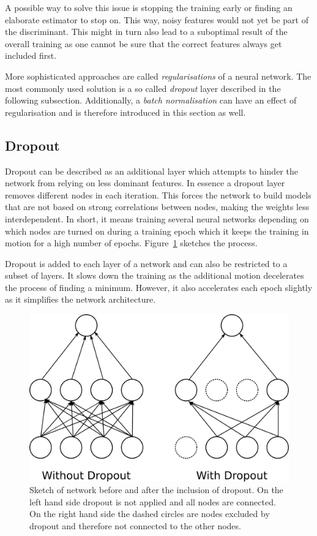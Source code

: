 A possible way to solve this issue is stopping the training early or finding an elaborate estimator to stop on. This way, noisy features would not yet be part of the discriminant. This might in turn also lead to a suboptimal result of the overall training as one cannot be sure that the correct features always get included first.

More sophisticated approaches are called \emph{regularisations} of a neural network. The most commonly used solution is a so called \emph{dropout} layer described in the following subsection. Additionally, a \emph{batch normalisation} can have an effect of regularisation and is therefore introduced in this section as well.

\subsection{Dropout}
\label{sec:dropout}

Dropout can be described as an additional layer which attempts to hinder the network from relying on less dominant features. In essence a dropout layer removes different nodes in each iteration. This forces the network to build models that are not based on strong correlations between nodes, making the weights less interdependent. In short, it means training several neural networks depending on which nodes are turned on during a training epoch which it keeps the training in motion for a high number of epochs. Figure~\ref{fig:dropout} sketches the process.

Dropout is added to each layer of a network and can also be restricted to a subset of layers. It slows down the training as the additional motion decelerates the process of finding a minimum. However, it also accelerates each epoch slightly as it simplifies the network architecture. 

\begin{figure}[htbp]
	\centering
	\includegraphics[scale = 0.1]{figures_ML/dropout.eps}
	\caption[Dropout Sketch]{Sketch of network before and after the inclusion of dropout. On the left hand side dropout is not applied and all nodes are connected. On the right hand side the dashed circles are nodes excluded by dropout and therefore not connected to the other nodes.}
	\label{fig:dropout}
\end{figure}



